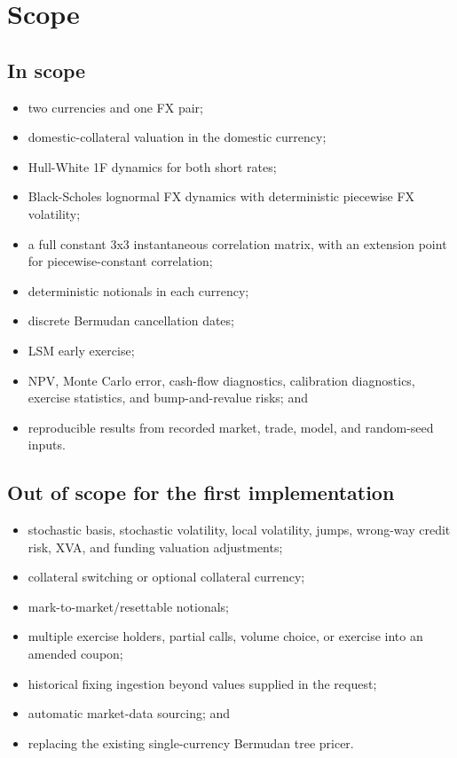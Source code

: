 \documentclass[conference]{IEEEtran}
\providecommand{\tightlist}{}
\begin{document}
\section{Scope}\label{3-scope}

\subsection{In scope}\label{31-in-scope}

\begin{itemize}
\tightlist
\item
  two currencies and one FX pair;
\item
  domestic-collateral valuation in the domestic currency;
\item
  Hull-White 1F dynamics for both short rates;
\item
  Black-Scholes lognormal FX dynamics with deterministic piecewise FX
  volatility;
\item
  a full constant 3x3 instantaneous correlation matrix, with an
  extension point for piecewise-constant correlation;
\item
  deterministic notionals in each currency;
\item
  discrete Bermudan cancellation dates;
\item
  LSM early exercise;
\item
  NPV, Monte Carlo error, cash-flow diagnostics, calibration
  diagnostics, exercise statistics, and bump-and-revalue risks; and
\item
  reproducible results from recorded market, trade, model, and
  random-seed inputs.
\end{itemize}

\subsection{Out of scope for the first
implementation}\label{32-out-of-scope-for-the-first-implementation}

\begin{itemize}
\tightlist
\item
  stochastic basis, stochastic volatility, local volatility, jumps,
  wrong-way credit risk, XVA, and funding valuation adjustments;
\item
  collateral switching or optional collateral currency;
\item
  mark-to-market/resettable notionals;
\item
  multiple exercise holders, partial calls, volume choice, or exercise
  into an amended coupon;
\item
  historical fixing ingestion beyond values supplied in the request;
\item
  automatic market-data sourcing; and
\item
  replacing the existing single-currency Bermudan tree pricer.
\end{itemize}
\end{document}
